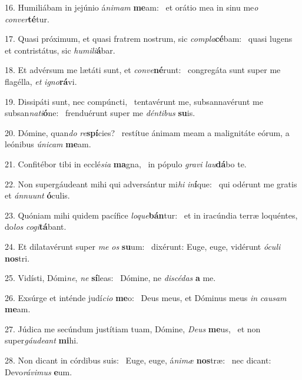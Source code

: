 16. Humiliábam in jejúnio á\textit{ni}\textit{mam} \textbf{me}am: \ast\  et orátio mea in sinu me\textit{o} \textit{con}\textit{ver}\textbf{té}tur.\

17. Quasi próximum, et quasi fratrem nostrum, sic \textit{com}\textit{pla}\textbf{cé}bam: \ast\  quasi lugens et contristátus, sic \textit{hu}\textit{mi}\textit{li}\textbf{á}bar.\

18. Et advérsum me lætáti sunt, et \textit{con}\textit{ve}\textbf{né}runt: \ast\  congregáta sunt super me flagélla, \textit{et} \textit{i}\textit{gno}\textbf{rá}vi.\

19. Dissipáti sunt, nec compúncti, \dag\  tentavérunt me, subsannavérunt me subsan\textit{na}\textit{ti}\textbf{ó}ne: \ast\  frenduérunt super me \textit{dén}\textit{ti}\textit{bus} \textbf{su}is.\

20. Dómine, quan\textit{do} \textit{re}\textbf{spí}cies? \ast\  restítue ánimam meam a malignitáte eórum, a leónibus \textit{ú}\textit{ni}\textit{cam} \textbf{me}am.\

21. Confitébor tibi in ecclé\textit{si}\textit{a} \textbf{ma}gna, \ast\  in pópulo \textit{gra}\textit{vi} \textit{lau}\textbf{dá}bo te.\

22. Non supergáudeant mihi qui adversántur mi\textit{hi} \textit{in}\textbf{í}que: \ast\  qui odérunt me gratis et \textit{án}\textit{nu}\textit{unt} \textbf{ó}culis.\

23. Quóniam mihi quidem pacífice \textit{lo}\textit{que}\textbf{bán}tur: \ast\  et in iracúndia terræ loquéntes, do\textit{los} \textit{co}\textit{gi}\textbf{tá}bant.\

24. Et dilatavérunt super \textit{me} \textit{os} \textbf{su}um: \ast\  dixérunt: Euge, euge, vidérunt \textit{ó}\textit{cu}\textit{li} \textbf{nos}tri.\

25. Vidísti, Dómi\textit{ne}, \textit{ne} \textbf{sí}leas: \ast\  Dómine, ne \textit{di}\textit{scé}\textit{das} \textbf{a} me.\

26. Exsúrge et inténde judí\textit{ci}\textit{o} \textbf{me}o: \ast\  Deus meus, et Dóminus meus \textit{in} \textit{cau}\textit{sam} \textbf{me}am.\

27. Júdica me secúndum justítiam tuam, Dómine, \textit{De}\textit{us} \textbf{me}us, \ast\  et non super\textit{gáu}\textit{de}\textit{ant} \textbf{mi}hi.\

28. Non dicant in córdibus suis: \dag\  Euge, euge, á\textit{ni}\textit{mæ} \textbf{nos}træ: \ast\  nec dicant: Devo\textit{rá}\textit{vi}\textit{mus} \textbf{e}um.\

